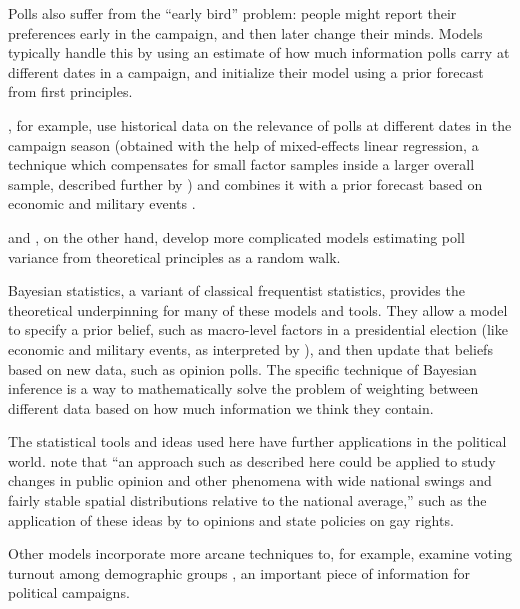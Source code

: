 \documentclass[12pt]{article}
\begin{document}
Polls also suffer from the ``early bird'' problem: people might report their preferences early in the campaign, and then later change their minds. Models typically handle this by using an estimate of how much information polls carry at different dates in a campaign, and initialize their model using a prior forecast from first principles.

\citet{Lock:2010aa}, for example, use historical data on the relevance of polls at different dates in the campaign season (obtained with the help of mixed-effects linear regression, a technique which compensates for small factor samples inside a larger overall sample, described further by \citealt{Gelman:2006aa}) and combines it with a prior forecast based on economic and military events \citep{Hibbs:2008aa}.

\citet{Strauss:2007aa} and \citet{Jackman:2005aa}, on the other hand, develop more complicated models estimating poll variance from theoretical principles as a random walk.

Bayesian statistics, a variant of classical frequentist statistics, provides the theoretical underpinning for many of these models and tools. They allow a model to specify a prior belief, such as macro-level factors in a presidential election (like economic and military events, as interpreted by \citealt{Hibbs:2008aa}), and then update that beliefs based on new data, such as opinion polls. The specific technique of Bayesian inference is a way to mathematically solve the problem of weighting between different data based on how much information we think they contain.

The statistical tools and ideas used here have further applications in the political world. \citet{Lock:2010aa} note that ``an approach such as described here could be applied to study changes in public opinion and other phenomena with wide national swings and fairly stable spatial distributions relative to the national average,'' such as the application of these ideas by \citet{Lax:2009aa} to opinions and state policies on gay rights.

Other models incorporate more arcane techniques to, for example, examine voting turnout among demographic groups \citep{Ghitza:2013aa}, an important piece of information for political campaigns.

\nocite{*}

\end{document}
